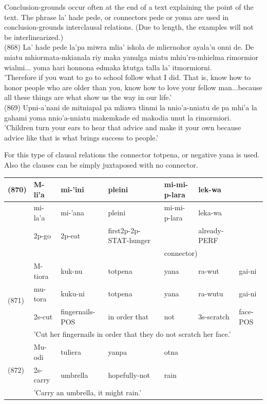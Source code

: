\documentclass[10pt]{article}
\begin{document}
Conclusion-grounds occur often at the end of a text explaining the point of the text. The phrase la' hade pede, or connectors pede or yoma are used in conclusion-grounds interclausal relations. (Due to length, the examples will not be interlinearized.)\\
(868) La' hade pede la'pa miwra mlia' iskola de mliernohor ayala'u onni de. De miatu mhiormata-mkianala riy maka yanulga miatu mhiu'ru-mhielma rimormior wialmi... yoma hari honnona edmaka ktutga talla la' itmormiorni.\\
'Therefore if you want to go to school follow what I did. That is, know how to honor people who are older than you, know how to love your fellow man...because all these things are what show us the way in our life.'\\
(869) Upni-a'nani de mitniapal pa mliawa tlinmi la nnio'a-nniatu de pa mhi'a la gahami yoma nnio'a-nniatu makemkade ed makodia unut la rimormiori.\\
'Children turn your ears to hear that advice and make it your own because advice like that is what brings success to people.'

For this type of clausal relations the connector totpena, or negative yana is used. Also the clauses can be simply juxtaposed with no connector.

\begin{center}
\begin{tabular}{|l|l|l|l|l|l|l|}
\hline
\multirow[t]{4}{*}{(870)} & M-li'a & mi-'ini & pleini & mi-mi-p-lara & lek-wa &  \\
\hline
 & mi-la'a & mi-'ana & pleini & mi-mi-p-lara & leka-wa &  \\
\hline
 & 2p-go & 2p-eat & first2p-2p-STAT-hunger &  & already-PERF &  \\
\hline
 & \multicolumn{3}{|c|}{} & \multicolumn{3}{|l|}{connector)} \\
\hline
\multirow[t]{4}{*}{(871)} & M-tiora & kuk-nu & totpena & yana & ra-wut & gai-ni \\
\hline
 & mu-tora & kuku-ni & totpena & yana & ra-wutu & gai-ni \\
\hline
 & 2s-cut & fingernails-POS & in order that & not & 3s-scratch & face-POS \\
\hline
 & \multicolumn{6}{|l|}{'Cut her fingernails in order that they do not scratch her face.'} \\
\hline
\multirow[t]{3}{*}{(872)} & Mu-odi & tuliera & yanpa & otna &  &  \\
\hline
 & 2s-carry & umbrella & hopefully-not & rain &  &  \\
\hline
 & \multicolumn{6}{|l|}{'Carry an umbrella, it might rain.'} \\
\hline
\end{tabular}
\end{center}
\end{document}
